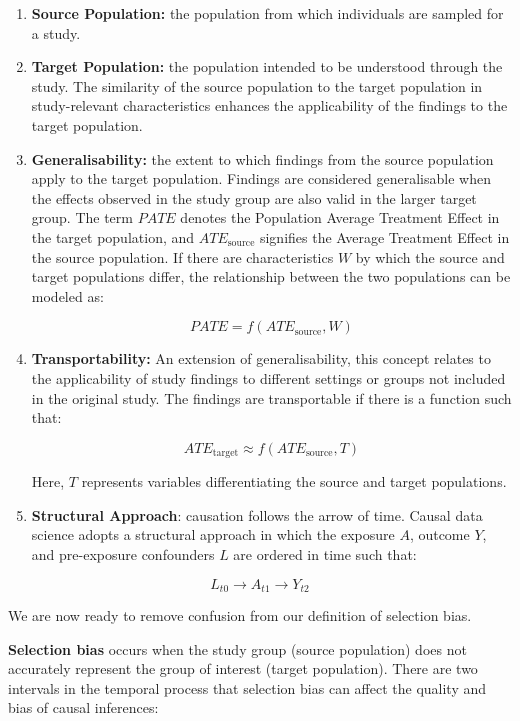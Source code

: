 \documentclass[
  singlecolumn,
  9pt]{article}
\begin{document}
\begin{enumerate}
\def\labelenumi{\arabic{enumi}.}
\item
  \textbf{Source Population:} the population from which individuals are
  sampled for a study.
\item
  \textbf{Target Population:} the population intended to be understood
  through the study. The similarity of the source population to the
  target population in study-relevant characteristics enhances the
  applicability of the findings to the target population.
\item
  \textbf{Generalisability:} the extent to which findings from the
  source population apply to the target population. Findings are
  considered generalisable when the effects observed in the study group
  are also valid in the larger target group. The term \(PATE\) denotes
  the Population Average Treatment Effect in the target population, and
  \(ATE_{\text{source}}\) signifies the Average Treatment Effect in the
  source population. If there are characteristics \(W\) by which the
  source and target populations differ, the relationship between the two
  populations can be modeled as:

  \[PATE = f(ATE_{\text{source}}, W)\]
\item
  \textbf{Transportability:} An extension of generalisability, this
  concept relates to the applicability of study findings to different
  settings or groups not included in the original study. The findings
  are transportable if there is a function such that:

  \[ATE_{\text{target}} \approx f(ATE_{\text{source}}, T)\]

  Here, \(T\) represents variables differentiating the source and target
  populations.
\item
  \textbf{Structural Approach}: causation follows the arrow of time.
  Causal data science adopts a structural approach in which the exposure
  \(A\), outcome \(Y\), and pre-exposure confounders \(L\) are ordered
  in time such that:
\end{enumerate}

\[
L_{t0}\to A_{t1} \to Y_{t2}
\]

We are now ready to remove confusion from our definition of selection
bias.

\textbf{Selection bias} occurs when the study group (source population)
does not accurately represent the group of interest (target population).
There are two intervals in the temporal process that selection bias can
affect the quality and bias of causal inferences:
\end{document}
